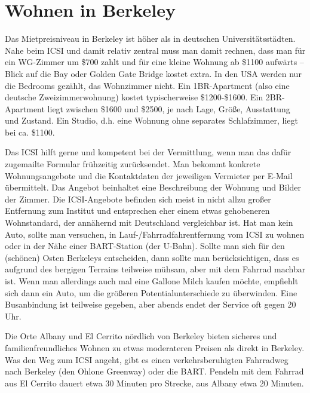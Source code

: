 \documentclass[a4paper]{scrreprt}
\begin{document}
\section{Wohnen in Berkeley}

Das Mietpreisniveau in Berkeley ist höher als in deutschen
Universitätsstädten. Nahe beim ICSI und damit relativ zentral muss man
damit rechnen, dass man für ein WG-Zimmer um \$700 zahlt und für eine
kleine Wohnung ab \$1100 aufwärts -- Blick auf die Bay oder Golden
Gate Bridge kostet extra.
In den USA werden nur die Bedrooms gezählt, das Wohnzimmer nicht.
Ein 1BR-Apartment (also eine deutsche Zweizimmerwohnung) kostet
typischerweise \$1200-\$1600.
Ein 2BR-Apartment liegt zwischen \$1600 und \$2500,
je nach Lage, Größe, Ausstattung und Zustand.
Ein Studio, d.h. eine Wohnung ohne separates Schlafzimmer,
liegt bei ca. \$1100.


Das ICSI hilft gerne und kompetent bei der
Vermittlung, wenn man das dafür zugemailte Formular frühzeitig
zurücksendet. Man bekommt konkrete Wohnungsangebote und die
Kontaktdaten der jeweiligen Vermieter per E-Mail übermittelt. Das
Angebot beinhaltet eine Beschreibung der Wohnung und Bilder der
Zimmer. Die ICSI-Angebote befinden sich meist in nicht allzu großer
Entfernung zum Institut und entsprechen eher einem etwas gehobeneren
Wohnstandard, der annähernd mit Deutschland vergleichbar ist. Hat man kein Auto,
sollte man versuchen, in Lauf-/Fahrradfahrentfernung vom 
ICSI zu wohnen oder in der Nähe einer BART-Station (der
U-Bahn). Sollte man sich für den (schönen) Osten Berkeleys
entscheiden, dann sollte man berücksichtigen, dass es aufgrund des
bergigen Terrains teilweise mühsam, aber mit dem Fahrrad machbar
ist. Wenn man allerdings auch mal eine Gallone Milch kaufen möchte,
empfiehlt sich dann ein Auto, um die größeren Potentialunterschiede zu
überwinden. Eine Busanbindung ist teilweise gegeben, aber abends endet
der Service oft gegen 20 Uhr.

Die Orte Albany und El Cerrito nördlich von Berkeley bieten sicheres
und familienfreundliches Wohnen zu etwas moderateren Preisen als
direkt in Berkeley. Was den Weg zum ICSI angeht, gibt es einen
verkehrsberuhigten Fahrradweg nach Berkeley (den Ohlone Greenway) oder
die BART. Pendeln mit dem Fahrrad aus El Cerrito dauert etwa 30
Minuten pro Strecke, aus Albany etwa 20 Minuten.
\end{document}
